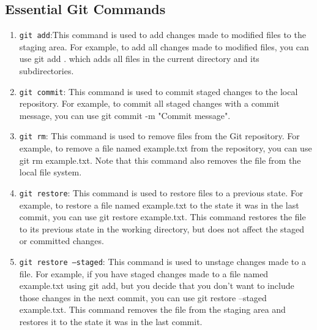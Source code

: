 \documentclass[10pt, a4paper]{article}
\begin{document}
\subsection*{Essential Git Commands}
\begin{enumerate}
    \item \texttt{git add}:This command is used to add changes made to modified files to the staging area. For example, to add all changes made to modified files, you can use git add . which adds all files in the current directory and its subdirectories.
    \item \texttt{git commit}: This command is used to commit staged changes to the local repository. For example, to commit all staged changes with a commit message, you can use git commit -m "Commit message".
    \item \texttt{git rm}: This command is used to remove files from the Git repository. For example, to remove a file named example.txt from the repository, you can use git rm example.txt. Note that this command also removes the file from the local file system.
    \item \texttt{git restore}: This command is used to restore files to a previous state. For example, to restore a file named example.txt to the state it was in the last commit, you can use git restore example.txt. This command restores the file to its previous state in the working directory, but does not affect the staged or committed changes.
    \item \texttt{git restore --staged}: This command is used to unstage changes made to a file. For example, if you have staged changes made to a file named example.txt using git add, but you decide that you don't want to include those changes in the next commit, you can use git restore --staged example.txt. This command removes the file from the staging area and restores it to the state it was in the last commit.
\end{enumerate}
\end{document}
